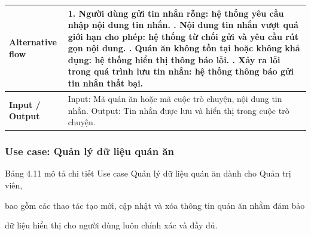 \begin{longtable}{|p{4cm}|p{10cm}|}
\textbf{Alternative flow} &
1. Người dùng gửi tin nhắn rỗng: hệ thống yêu cầu nhập nội dung tin nhắn. \newline
2. Nội dung tin nhắn vượt quá giới hạn cho phép: hệ thống từ chối gửi và yêu cầu rút gọn nội dung. \newline
3. Quán ăn không tồn tại hoặc không khả dụng: hệ thống hiển thị thông báo lỗi. \newline
4. Xảy ra lỗi trong quá trình lưu tin nhắn: hệ thống thông báo gửi tin nhắn thất bại. \\
\hline

\textbf{Input / Output} &
Input: Mã quán ăn hoặc mã cuộc trò chuyện, nội dung tin nhắn. \newline
Output: Tin nhắn được lưu và hiển thị trong cuộc trò chuyện. \\
\hline

\end{longtable}
%

\subsubsection{Use case: Quản lý dữ liệu quán ăn}

Bảng 4.11 mô tả chi tiết Use case Quản lý dữ liệu quán ăn dành cho Quản trị viên,

bao gồm các thao tác tạo mới, cập nhật và xóa thông tin quán ăn nhằm đảm bảo

dữ liệu hiển thị cho người dùng luôn chính xác và đầy đủ.


